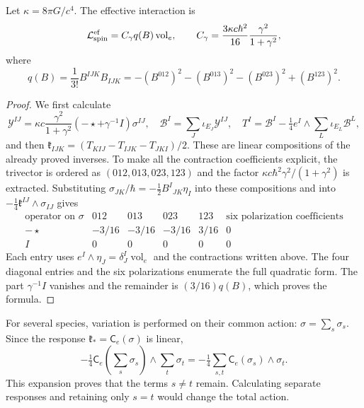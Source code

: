 \begin{theorem}
\label{hmtcuatro:ant:coeficiente} Let \(\kappa=8\pi G/c^4\). The effective interaction is
\[
 \mathcal L_{\rm spin}^{\rm ef}
 =C_\gamma q(B)\operatorname{vol}_e,\qquad
 C_\gamma=\frac{3\kappa c\hbar^2}{16}
                    \frac{\gamma^2}{1+\gamma^2},
\]
where
\[
 q(B)=\frac1{3!}B^{IJK}B_{IJK}
 =-(B^{012})^2-(B^{013})^2-(B^{023})^2+(B^{123})^2 .
\]
\end{theorem}
\begin{proof}
We first calculate
\[
 \mathcal Y^{IJ}
 =\kappa c\frac{\gamma^2}{1+\gamma^2}
       (-\star+\gamma^{-1}I)\sigma^{IJ},\quad
 \mathcal B^I=\sum_J\iota_{E_J}\mathcal Y^{IJ},\quad
 T^I=\mathcal B^I-\tfrac14e^I\wedge\sum_L\iota_{E_L}\mathcal B^L,
\]
and then \(\mathfrak k_{IJK}=(T_{KIJ}-T_{IJK}-T_{JKI})/2\). These are linear compositions of the already proved inverses. To make all the contraction coefficients explicit, the trivector is ordered as \((012,013,023,123)\) and the factor \(\kappa c\hbar^2\gamma^2/(1+\gamma^2)\) is extracted. Substituting \(\sigma_{JK}/\hbar=-\frac12B^I{}_{JK}\eta_I\) into these compositions and into \(-\frac14\mathfrak k^{IJ}\wedge\sigma_{IJ}\) gives
\[
 \begin{array}{c|rrrr|c}
  \text{operator on }\sigma&012&013&023&123&
           \text{six polarization coefficients}\\ \hline
  -\star&-3/16&-3/16&-3/16&3/16&0\\
  I&0&0&0&0&0
 \end{array}
\]
Each entry uses \(e^I\wedge\eta_J=\delta_J^I\operatorname{vol}_e\) and the contractions written above. The four diagonal entries and the six polarizations enumerate the full quadratic form. The part \(\gamma^{-1}I\) vanishes and the remainder is \((3/16)q(B)\), which proves the formula.
\end{proof}

For several species, variation is performed on their common action: \(\sigma=\sum_s\sigma_s\). Since the response \(\mathfrak k_*=\mathsf C_e(\sigma)\) is linear,
\begin{equation}
 -\tfrac14\mathsf C_e\!\left(\sum_s\sigma_s\right)
       \wedge\sum_t\sigma_t
 =-\tfrac14\sum_{s,t}\mathsf C_e(\sigma_s)\wedge\sigma_t .
 \label{hmtcuatro:ant:cruces-especies}
\end{equation}
This expansion proves that the terms \(s\ne t\) remain. Calculating separate responses and retaining only \(s=t\) would change the total action.

